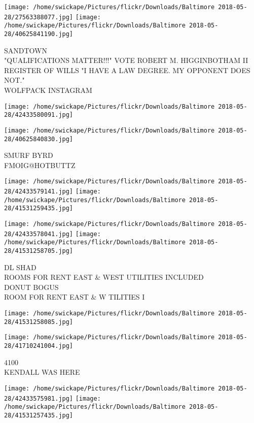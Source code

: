 \documentclass[10pt,letterpaper]{article}
\begin{document}
\vspace{0.25in}
\texttt{[image: /home/swickape/Pictures/flickr/Downloads/Baltimore 2018-05-28/27563388077.jpg]}
\texttt{[image: /home/swickape/Pictures/flickr/Downloads/Baltimore 2018-05-28/40625841190.jpg]}

SANDTOWN\\
"QUALIFICATIONS MATTER!!!" VOTE ROBERT M. HIGGINBOTHAM II REGISTER OF WILLS "I HAVE A LAW DEGREE.  MY OPPONENT DOES NOT."\\
WOLFPACK INSTAGRAM\\
\pagebreak

\texttt{[image: /home/swickape/Pictures/flickr/Downloads/Baltimore 2018-05-28/42433580091.jpg]}

\vspace{0.25in}
\texttt{[image: /home/swickape/Pictures/flickr/Downloads/Baltimore 2018-05-28/40625840830.jpg]}

SMURF BYRD\\
FMOIG@HOTBUTTZ\\
\pagebreak

\texttt{[image: /home/swickape/Pictures/flickr/Downloads/Baltimore 2018-05-28/42433579141.jpg]}
\texttt{[image: /home/swickape/Pictures/flickr/Downloads/Baltimore 2018-05-28/41531259435.jpg]}

\texttt{[image: /home/swickape/Pictures/flickr/Downloads/Baltimore 2018-05-28/42433578041.jpg]}
\texttt{[image: /home/swickape/Pictures/flickr/Downloads/Baltimore 2018-05-28/41531258705.jpg]}

DL SHAD\\
ROOMS FOR RENT EAST \& WEST UTILITIES INCLUDED\\
DONUT BOGUS\\
ROOM FOR RENT EAST \& W TILITIES I\\
\pagebreak

\texttt{[image: /home/swickape/Pictures/flickr/Downloads/Baltimore 2018-05-28/41531258085.jpg]}

\vspace{0.25in}
\texttt{[image: /home/swickape/Pictures/flickr/Downloads/Baltimore 2018-05-28/41710241004.jpg]}

4100\\
KENDALL WAS HERE\\
\pagebreak

\texttt{[image: /home/swickape/Pictures/flickr/Downloads/Baltimore 2018-05-28/42433575981.jpg]}
\texttt{[image: /home/swickape/Pictures/flickr/Downloads/Baltimore 2018-05-28/41531257435.jpg]}
\end{document}
